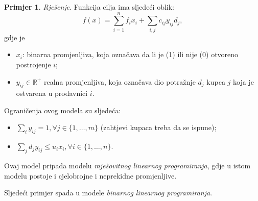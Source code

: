 \documentclass[a4paper, utf8, 11pt, colorlinks]{book}
\theoremstyle{definition}
\newtheorem{primjer}{Primjer}[chapter]
\begin{document}
\begin{primjer}
\emph{Rješenje}. Funkcija cilja ima sljedeći oblik:
$$ f(x) = \sum_{i=1}^n f_i x_i  + \sum_{i,j} c_{ij} y_{ij} d_j,$$
gdje je
\begin{itemize}
	\item $x_i$: binarna promjenljiva, koja označava da li je (1) ili nije (0) otvoreno postrojenje $i$;
	\item $y_{ij} \in \mathbb{R}^+$ realna promjenljiva, koja označava dio potražnje $d_j$ kupca $j$ koja je ostvarena u prodavnici $i$.
\end{itemize}
Ograničenja ovog modela su sljedeća:
\begin{itemize}
	\item $\sum_{i} y_{ij} = 1, \forall j\in\{1,\ldots,m\}$ (zahtjevi kupaca treba da se ispune);
	\item $\sum_{j} d_j y_{ij} \leq u_i x_i, \forall i \in \{1,\ldots,n\}$.
\end{itemize}
Ovaj model pripada modelu \emph{mješovitnog linearnog programiranja}, gdje u istom modelu postoje i cjelobrojne i neprekidne promjenljive.
\end{primjer}

Sljedeći primjer spada u modele \emph{binarnog linearnog programiranja}. 
\end{document}
